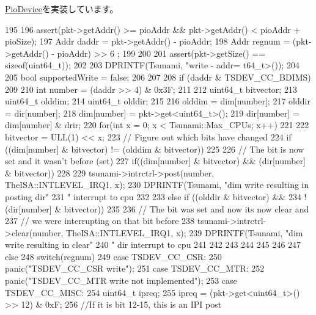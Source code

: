 \hyperlink{classPioDevice_afe8371668d023bb2516b286e5e399b6f}{PioDevice}を実装しています。


\begin{DoxyCode}
195 {
196     assert(pkt->getAddr() >= pioAddr && pkt->getAddr() < pioAddr + pioSize);
197     Addr daddr = pkt->getAddr() - pioAddr;
198     Addr regnum = (pkt->getAddr() - pioAddr) >> 6 ;
199 
200 
201     assert(pkt->getSize() == sizeof(uint64_t));
202 
203     DPRINTF(Tsunami, "write - addr=%
      t64_t>());
204 
205     bool supportedWrite = false;
206 
207 
208     if (daddr & TSDEV_CC_BDIMS)
209     {
210         int number = (daddr >> 4) & 0x3F;
211 
212         uint64_t bitvector;
213         uint64_t olddim;
214         uint64_t olddir;
215 
216         olddim = dim[number];
217         olddir = dir[number];
218         dim[number] = pkt->get<uint64_t>();
219         dir[number] = dim[number] & drir;
220         for(int x = 0; x < Tsunami::Max_CPUs; x++)
221         {
222             bitvector = ULL(1) << x;
223             // Figure out which bits have changed
224             if ((dim[number] & bitvector) != (olddim & bitvector))
225             {
226                 // The bit is now set and it wasn't before (set)
227                 if((dim[number] & bitvector) && (dir[number] & bitvector))
228                 {
229                     tsunami->intrctrl->post(number, TheISA::INTLEVEL_IRQ1, x);
230                     DPRINTF(Tsunami, "dim write resulting in posting dir"
231                             " interrupt to cpu %
232                 }
233                 else if ((olddir & bitvector) &&
234                         !(dir[number] & bitvector))
235                 {
236                     // The bit was set and now its now clear and
237                     // we were interrupting on that bit before
238                     tsunami->intrctrl->clear(number, TheISA::INTLEVEL_IRQ1, x);
239                     DPRINTF(Tsunami, "dim write resulting in clear"
240                             " dir interrupt to cpu %
241 
242                 }
243 
244 
245             }
246         }
247     } else {
248         switch(regnum) {
249           case TSDEV_CC_CSR:
250               panic("TSDEV_CC_CSR write\n");
251           case TSDEV_CC_MTR:
252               panic("TSDEV_CC_MTR write not implemented\n");
253           case TSDEV_CC_MISC:
254             uint64_t ipreq;
255             ipreq = (pkt->get<uint64_t>() >> 12) & 0xF;
256             //If it is bit 12-15, this is an IPI post
}}}
\end{DoxyCode}
